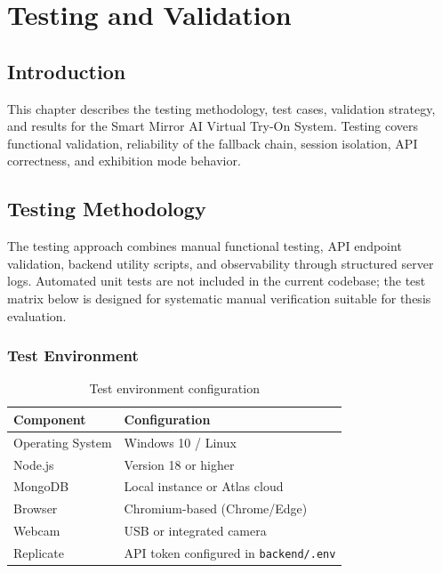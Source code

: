 \chapter{Testing and Validation}
\label{ch:testing}

\section{Introduction}
\label{sec:testing-intro}

This chapter describes the testing methodology, test cases, validation strategy, and results for the Smart Mirror AI Virtual Try-On System. Testing covers functional validation, reliability of the fallback chain, session isolation, API correctness, and exhibition mode behavior.

\section{Testing Methodology}
\label{sec:testing-methodology}

The testing approach combines manual functional testing, API endpoint validation, backend utility scripts, and observability through structured server logs. Automated unit tests are not included in the current codebase; the test matrix below is designed for systematic manual verification suitable for thesis evaluation.

\subsection{Test Environment}

\begin{table}[H]
  \centering
  \caption{Test environment configuration}
  \label{tab:test-env}
  \begin{tabular}{@{}ll@{}}
    \toprule
    \textbf{Component} & \textbf{Configuration} \\
    \midrule
    Operating System & Windows 10 / Linux \\
    Node.js & Version 18 or higher \\
    MongoDB & Local instance or Atlas cloud \\
    Browser & Chromium-based (Chrome/Edge) \\
    Webcam & USB or integrated camera \\
    Replicate & API token configured in \texttt{backend/.env} \\
    \bottomrule
  \end{tabular}
\end{table}

